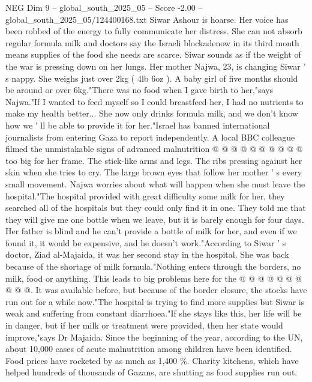 \begin{textsample}{NEG Dim 9 – global\_south\_2025\_05 – Score -2.00 – global\_south\_2025\_05/124400168.txt}  \label{ex:f9_neg_253}
Siwar Ashour is hoarse.
Her voice has been robbed of the energy to fully communicate her distress.
She can not absorb regular formula milk and doctors say the Israeli blockadenow in its third month means supplies of the food she needs are scarce.
Siwar sounds as if the weight of the war is pressing down on her lungs.
Her mother Najwa, 23, is changing Siwar ' s nappy.
She weighs just over 2kg ( 4lb 6oz ).
A baby girl of five months should be around or over 6kg."There was no food when I gave birth to her,"says Najwa."If I wanted to feed myself so I could breastfeed her, I had no nutrients to make my health better...
She now only drinks formula milk, and we don't know how we ' ll be able to provide it for her."Israel has banned international journalists from entering Gaza to report independently.
A local BBC colleague filmed the unmistakable signs of advanced malnutrition @ @ @ @ @ @ @ @ @ @ too big for her frame.
The stick-like arms and legs.
The ribs pressing against her skin when she tries to cry.
The large brown eyes that follow her mother ' s every small movement.
Najwa worries about what will happen when she must leave the hospital."The hospital provided with great difficulty some milk for her, they searched all of the hospitals but they could only find it in one.
They told me that they will give me one bottle when we leave, but it is barely enough for four days.
Her father is blind and he can't provide a bottle of milk for her, and even if we found it, it would be expensive, and he doesn't work."According to Siwar ' s doctor, Ziad al-Majaida, it was her second stay in the hospital.
She was back because of the shortage of milk formula."Nothing enters through the borders, no milk, food or anything.
This leads to big problems here for the @ @ @ @ @ @ @ @ @ @.
It was available before, but because of the border closure, the stocks have run out for a while now."The hospital is trying to find more supplies but Siwar is weak and suffering from constant diarrhoea."If she stays like this, her life will be in danger, but if her milk or treatment were provided, then her state would improve,"says Dr Majaida.
Since the beginning of the year, according to the UN, about 10,000 cases of acute malnutrition among children have been identified.
Food prices have rocketed by as much as 1,400 \%.
Charity kitchens, which have helped hundreds of thousands of Gazans, are shutting as food supplies run out.

\end{textsample}

